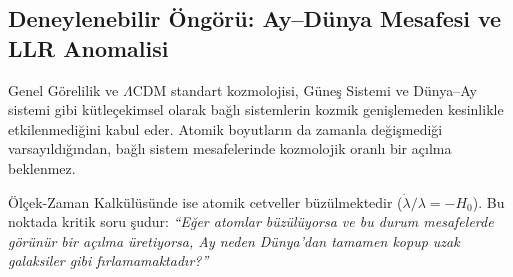 \documentclass[11pt,a4paper]{article}
\begin{document}
\subsection{Deneylenebilir Öngörü: Ay--Dünya Mesafesi ve LLR Anomalisi}
\label{sec:llr_ongoru}

Genel Görelilik ve $\Lambda$CDM standart kozmolojisi, Güneş Sistemi ve Dünya--Ay sistemi gibi kütleçekimsel olarak bağlı sistemlerin kozmik genişlemeden kesinlikle etkilenmediğini kabul eder. Atomik boyutların da zamanla değişmediği varsayıldığından, bağlı sistem mesafelerinde kozmolojik oranlı bir açılma beklenmez.

Ölçek-Zaman Kalkülüsünde ise atomik cetveller büzülmektedir ($\dot{\lambda}/\lambda = -H_0$). Bu noktada kritik soru şudur: \textit{``Eğer atomlar büzülüyorsa ve bu durum mesafelerde görünür bir açılma üretiyorsa, Ay neden Dünya'dan tamamen kopup uzak galaksiler gibi fırlamamaktadır?''}
\end{document}
